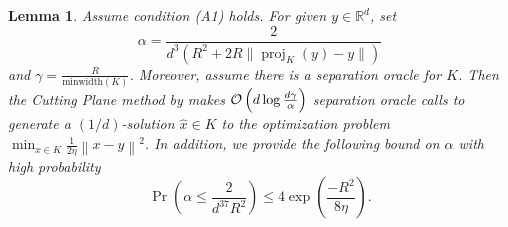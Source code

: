 \documentclass[11pt,letterpaper]{article}
\newcommand{\R}{\mathbb{R}}
\newcommand{\norm}[1]{\left\lVert #1 \right\rVert}
\newcommand{\proj}{\operatorname{proj}}
\newcommand{\brac}[1]{\left( #1\right)}
\newtheorem{lemma}[thm]{Lemma}
\begin{document}
\begin{lemma}
\label{lem:cuttingplanealg:deltasolution} Assume condition (A1) holds. For given $y\in \R^d$, set
\begin{equation}\label{eq:alpha}
    \alpha= \frac{2}{d^3\brac{R^2 + 2R\|\proj_K(y)-y\|}}
\end{equation}    
and $\gamma=\frac{R}{\mbox{minwidth}(K)}$.
    Moreover, assume there is a separation oracle for $K$. Then the Cutting Plane method by \cite{jiang2020cuttingplane} makes ${\cal O}\left(d \log \frac{d \gamma}{\alpha}\right)$ separation oracle calls to generate a $(1/d)$-solution $\hat{x}\in K$ to the optimization problem $\min_{x\in K} \frac{1}{2\eta}\norm{x-y}^2$. 
    In addition, we provide the following bound on $\alpha$ with high probability
   \begin{equation}\label{ineq:prob}
    \Pr\brac{\alpha\leq \frac{2}{d^37R^2} }\leq 4 \exp\brac{\frac{-R^2}{8\eta}}. 
\end{equation}
\end{lemma}
\end{document}
